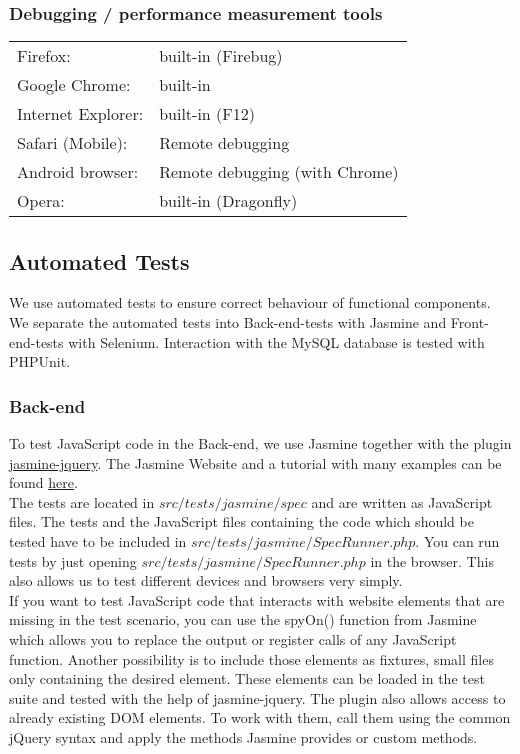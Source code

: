 \documentclass[twoside,12pt,a4paper]{article}
\begin{document}
\subsubsection{Debugging / performance measurement tools} %
\label{sub:debugging_tools}

\begin{tabular}{ll}
Firefox:				& built-in (Firebug) \\
Google Chrome: 		& built-in \\
Internet Explorer:	& built-in (F12) \\
Safari (Mobile):	& Remote debugging \\
Android browser:	& Remote debugging (with Chrome) \\
Opera:				& built-in (Dragonfly) \\
\end{tabular}


\subsection{Automated Tests}
We use automated tests to ensure correct behaviour of functional components. We separate the automated tests into Back-end-tests with Jasmine and Front-end-tests with Selenium. Interaction with the MySQL database is tested with PHPUnit.

\subsubsection{Back-end}
To test JavaScript code in the Back-end, we use Jasmine together with the plugin \href{https://github.com/velesin/jasmine-jquery}{jasmine-jquery}. The Jasmine Website and a tutorial with many examples can be found \href{http://jasmine.github.io/2.1/introduction.html}{here}.\\
The tests are located in $src/tests/jasmine/spec$ and are written as JavaScript files. The tests and the JavaScript files containing the code which should be tested have to be included in $src/tests/jasmine/SpecRunner.php$. You can run tests by just opening $src/tests/jasmine/SpecRunner.php$ in the browser. This also allows us to test different devices and browsers very simply.\\
If you want to test JavaScript code that interacts with website elements that are missing in the test scenario, you can use the spyOn() function from Jasmine which allows you to replace the output or register calls of any JavaScript function. Another possibility is to include those elements as fixtures, small files only containing the desired element. These elements can be loaded in the test suite and tested with the help of jasmine-jquery. The plugin also allows access to already existing DOM elements. To work with them, call them using the common jQuery syntax and apply the methods Jasmine provides or custom methods.
\end{document}
